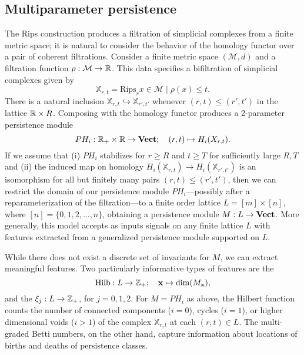 \documentclass{article}
\begin{document}
\subsection{Multiparameter persistence}
The Rips construction produces a filtration of simplicial complexes from a
finite metric space; it is natural to consider the behavior of the homology
functor over a pair of coherent filtrations. Consider
a finite metric space $(\mathcal M, d)$ and a filtration
function $\rho:\mathcal M \to \mathbb{R}$. This data specifies a bifiltration of
simplicial complexes given by
\[\mathbb{X}_{r,t} = \text{Rips}_r{x \in \mathcal M \mid \rho(x) \leq t}.\]
There is a natural inclusion $\mathbb{X}_{r,t} \hookrightarrow
\mathbb{X}_{r',t'}$ whenever $(r,t) \leq (r',t')$ in the lattice $\mathbb{R} \times R$.
Composing with the homology functor produces a 2-parameter persistence module
\[PH_{i}: \mathbb{R}_+ \times \mathbb{R} \to \operatorname{\mathbf{Vect}}; \quad (r,t) \mapsto H_i(X_{r,t}).\]
If we assume that (i) $PH_i$ stabilizes for $r \geq R$ and $t \geq T$ for
sufficiently large $R, T$ and (ii) the induced map on homology
$H_i(\mathbb{X}_{r,t}) \to H_i(\mathbb{X}_{r',t'})$ is an isomorphism for all
but finitely many pairs $(r,t) \leq (r',t')$, then we can restrict the domain of
our persistence module $PH_i$---possibly after a reparameterization of the
filtration---to a finite order lattice $L = [m] \times [n]$, where $[n] =
\{0,1,2,\ldots,n\}$, obtaining a persistence module $M: L \to \operatorname{\mathbf{Vect}}$.
More generally, this model accepts as inputs signals on any finite lattice $L$
with features extracted from a generalized persistence module supported on $L$.


While there does not exist a discrete set of invariants for $M$, we can extract
meaningful features. Two particularly informative types of features are 
 the 
  \[\text{Hilb}: L \to \mathbb{Z}_+;\quad \mathbf{x} \mapsto \dim(M_\mathbf{x}),\] and
the  $\xi_j: L \to \mathbb{Z}_+$, for $j =
0,1,2$. For $M = PH_i$ as above, the Hilbert function counts the number of
connected components ($i=0$), cycles ($i=1$), or higher dimensional voids ($i >
1$) of the complex $\mathbb{X}_{r,t}$ at each $(r,t) \in L$. The multi-graded
Betti numbers, on the other hand, capture information about locations of births
and deaths of persistence classes.
\end{document}
